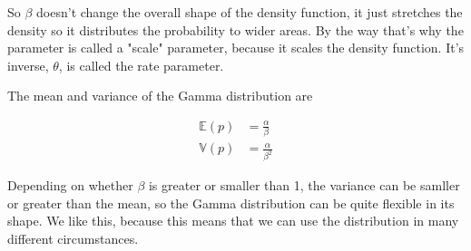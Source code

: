 \documentclass[11pt]{article}
\begin{document}
So \(\beta\) doesn't change the overall shape of the density function, it just stretches the density so it distributes the probability to wider areas. By the way that's why the parameter is called a "scale" parameter, because it scales the density function. It's inverse, \(\theta\), is called the rate parameter.

The mean and variance of the Gamma distribution are

\begin{align*}
\mathbb{E}(p) &= \frac{\alpha}{\beta} \\
\mathbb{V}(p) &= \frac{\alpha}{\beta^2}
\end{align*}

Depending on whether \(\beta\) is greater or smaller than 1, the variance can be samller or greater than the mean, so the Gamma distribution can be quite flexible in its shape. We like this, because this means that we can use the distribution in many different circumstances.
\end{document}

